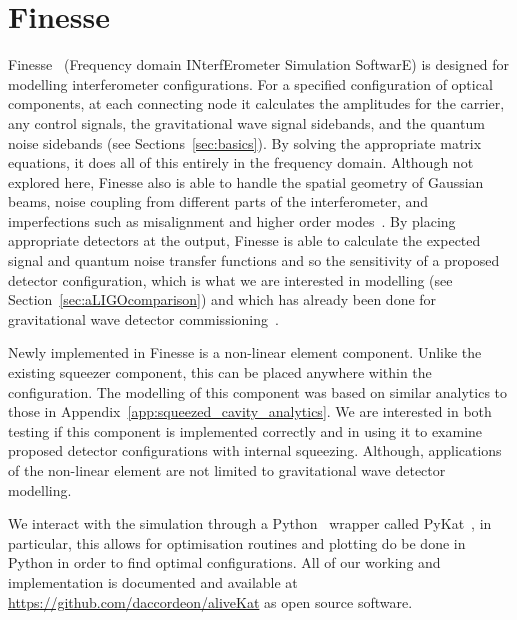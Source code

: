\documentclass[aps,pra,superscriptaddress,reprint,nofootinbib]{revtex4-1}
\begin{document}
\section{Finesse} %
\label{sec:Finesse}

Finesse~\cite{finesse} (Frequency domain INterfErometer Simulation SoftwarE) is designed for modelling interferometer configurations. For a specified configuration of optical components, at each connecting node it calculates the amplitudes for the carrier, any control signals, the gravitational wave signal sidebands, and the quantum noise sidebands (see Sections~\ref{sec:basics}). By solving the appropriate matrix equations, it does all of this entirely in the frequency domain.
Although not explored here, Finesse also is able to handle the spatial geometry of Gaussian beams, noise coupling from different parts of the interferometer, and imperfections such as misalignment and higher order modes~\cite{Bond_et_al_2016}.
By placing appropriate detectors at the output, Finesse is able to calculate the expected signal and quantum noise transfer functions and so the sensitivity of a proposed detector configuration, which is what we are interested in modelling (see Section~\ref{sec:aLIGOcomparison}) and which has already been done for gravitational wave detector commissioning~\cite{brown2020pykat}.


Newly implemented in Finesse is a non-linear element component. Unlike the existing squeezer component, this can be placed anywhere within the configuration. The modelling of this component was based on similar analytics to those in Appendix~\ref{app:squeezed_cavity_analytics}. We are interested in both testing if this component is implemented correctly and in using it to examine proposed detector configurations with internal squeezing. Although, applications of the non-linear element are not limited to gravitational wave detector modelling.


We interact with the simulation through a Python~\cite{python} wrapper called PyKat~\cite{brown2020pykat}, in particular, this allows for optimisation routines and plotting do be done in Python in order to find optimal configurations. All of our working and implementation is documented and available at \url{https://github.com/daccordeon/aliveKat} as open source software.


\end{document}
